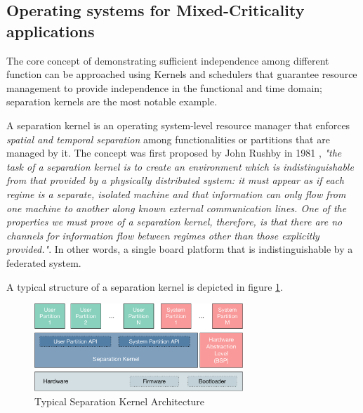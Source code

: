\subsection{Operating systems for Mixed-Criticality applications}
The core concept of demonstrating sufficient independence among different function can be approached using Kernels and schedulers that guarantee resource management to provide independence in the functional and time domain; separation kernels are the most notable example.
\par A separation kernel is an operating system-level resource manager that enforces \emph{spatial and temporal separation} among functionalities or partitions that are managed by it. The concept was first proposed by John Rushby in 1981 \cite{separationkernel}, \emph{"the task of a separation kernel is to create an environment which is indistinguishable from that provided by a physically distributed system: it must appear as if each regime is a separate, isolated machine and that information can only flow from one machine to another along known external communication lines. One of the properties we must prove of a separation kernel, therefore, is that there are no channels for information flow between regimes other than those explicitly provided."}. In other words, a single board platform that is indistinguishable by a federated system. 
\par A typical structure of a separation kernel is depicted in figure \ref{fig:separationkernel}. 
\begin{figure}[htbp] 
\centering    
\includegraphics[width=0.7\textwidth]{SeparationKernel}
\caption{Typical Separation Kernel Architecture}
\label{fig:separationkernel}
\end{figure}
